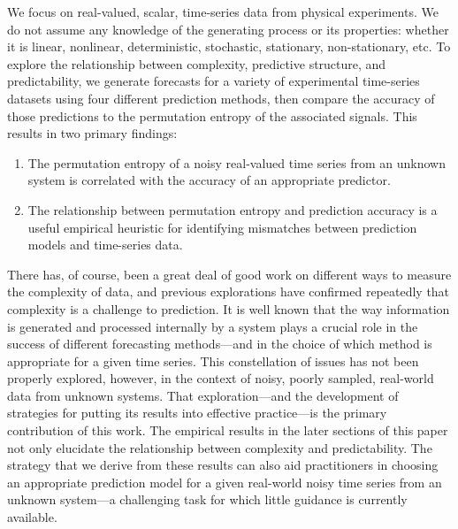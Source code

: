 We focus on real-valued, scalar, time-series data from physical experiments.
%
%
We do not assume any knowledge of the generating process or its
properties: whether it is linear, nonlinear, deterministic,
stochastic, stationary, non-stationary, etc.  To explore the
relationship between complexity, predictive structure, and
predictability, we generate forecasts for a variety of experimental
time-series datasets using four different prediction methods, then
compare the accuracy of those predictions to the permutation entropy
of the associated signals.  This results in two primary findings:
% 
\begin{enumerate}

\item The permutation entropy of a noisy real-valued time series from
  an unknown system is correlated with the accuracy of an appropriate
  predictor.

\item The relationship between permutation entropy and prediction
  accuracy is a useful empirical heuristic for identifying mismatches
  between prediction models and time-series data.

\end{enumerate}
% 
There has, of course, been a great deal of good work on different ways
to measure the complexity of data, and previous explorations have
confirmed repeatedly that complexity is a challenge to prediction.  It
is well known that the way information is generated and processed
internally by a system plays a crucial role in the success of
different forecasting methods---and in the choice of which method is
appropriate for a given time series.  This constellation of issues has
not been properly explored, however, in the context of noisy, poorly
sampled, real-world data from unknown systems.  That exploration---and
the development of strategies for putting its results into effective
practice---is the primary contribution of this work.  The empirical
results in the later sections of this paper not only elucidate the
relationship between complexity and predictability.  The strategy that
we derive from these results can also aid practitioners in choosing an
appropriate prediction model for a given real-world noisy time series
from an unknown system---a challenging task for which little guidance
is currently available.

